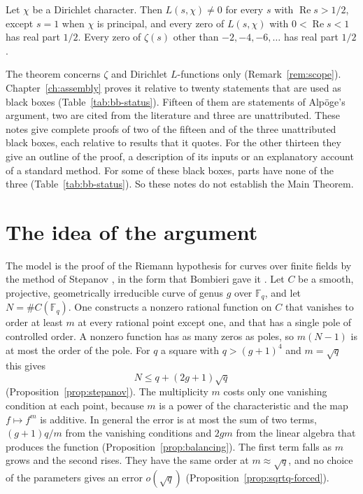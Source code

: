 \documentclass[11pt]{amsbook}
\theoremstyle{plain}
\theoremstyle{definition}
\theoremstyle{remark}
\numberwithin{equation}{section}
\numberwithin{figure}{chapter}
\numberwithin{table}{chapter}
\newcommand{\F}{\mathbb{F}}
\begin{document}
\begin{maintheorem}
Let $\chi$ be a Dirichlet character. Then $L(s,\chi)\ne0$ for
every $s$ with $\operatorname{Re}s>1/2$, except $s=1$ when $\chi$
is principal, and every zero of $L(s,\chi)$ with
$0<\operatorname{Re}s<1$ has real part $1/2$. Every zero of
$\zeta(s)$ other than $-2,-4,-6,\dots$ has real part $1/2$.
\end{maintheorem}

The theorem concerns $\zeta$ and Dirichlet $L$-functions only
(Remark~\ref{rem:scope}). Chapter~\ref{ch:assembly} proves it
relative to twenty statements that are used as black boxes
(Table~\ref{tab:bb-status}). Fifteen of them are statements of
Alp\"oge's argument, two are cited from the literature and three
are unattributed. These notes give complete proofs of two of the
fifteen and of the three unattributed black boxes, each relative to
results that it quotes. For the other thirteen they give an outline
of the proof, a description of its inputs or an explanatory account
of a standard method. For some of these black boxes, parts have
none of the three (Table~\ref{tab:bb-status}). So these notes do
not establish the Main Theorem.

\section*{The idea of the argument}

The model is the proof of the Riemann hypothesis for curves over
finite fields by the method of Stepanov \cite{Stepanov1969}, in the
form that Bombieri gave it \cite{Bombieri1974}. Let $C$ be a
smooth, projective, geometrically irreducible curve of genus $g$
over $\F_q$, and let $N=\#C(\F_q)$. One constructs a nonzero
rational function on $C$ that vanishes to order at least $m$ at
every rational point except one, and that has a single pole of
controlled order. A nonzero function has as many zeros as poles,
so $m(N-1)$ is at most the order of the pole. For $q$ a square with
$q>(g+1)^4$ and $m=\sqrt q$ this gives
\[
  N\le q+(2g+1)\sqrt q
\]
(Proposition~\ref{prop:stepanov}). The multiplicity $m$ costs only
one vanishing condition at each point, because $m$ is a power of
the characteristic and the map $f\mapsto f^m$ is additive. In
general the error is at most the sum of two terms, $(g+1)q/m$ from
the vanishing conditions and $2gm$ from the linear algebra that
produces the function (Proposition~\ref{prop:balancing}). The first
term falls as $m$ grows and the second rises. They have the same
order at $m\approx\sqrt q$, and no choice of the parameters gives
an error $o(\sqrt q)$ (Proposition~\ref{prop:sqrtq-forced}).
\end{document}
